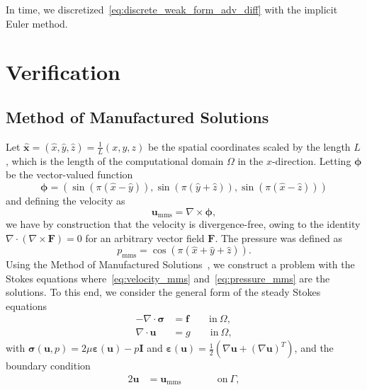 \documentclass[fleqn]{wlscirep}
\newcommand{\ff}{\mathbf{f}}
\newcommand{\uu}{\mathbf{u}}
\newcommand{\xx}{\bm{x}}
\newcommand{\bsig}{\bm{\sigma}}
\newcommand{\beps}{\bm{\varepsilon}}
\begin{document}
In time, we discretized~\eqref{eq:discrete_weak_form_adv_diff} with the implicit Euler method.

\section{Verification}\label{sec:appB_verification}
\subsection{Method of Manufactured Solutions}\label{subsec:mms}
Let $\hat{\xx} = (\hat{x}, \hat{y}, \hat{z}) = \frac{1}{L}(x, y, z)$
be the spatial coordinates scaled by the length $L$, which is the length of
the computational domain $\Omega$ in the $x$-direction. Letting $\bm{\phi}$ be the vector-valued function
\begin{equation*}
    \bm{\phi} = \left(\sin{(\pi(\hat{x} - \hat{y}))}, \sin{(\pi(\hat{y} + \hat{z}))}, \sin{(\pi(\hat{x} - \hat{z}))}\right)
\end{equation*}
and defining the velocity as 
\begin{equation}
    \uu_{\mathrm{mms}} = \nabla\times\bm{\phi},
    \label{eq:velocity_mms}
\end{equation}
we have by construction that the velocity is divergence-free,
owing to the identity $\nabla\cdot(\nabla\times\mathbf{F}) = 0$ for
an arbitrary vector field $\mathbf{F}$. The pressure was defined as
\begin{equation}
    p_{\mathrm{mms}} = \cos{(\pi(\hat{x} + \hat{y} + \hat{z}))}.
    \label{eq:pressure_mms}
\end{equation}
Using the Method of Manufactured Solutions~\cite{Roache2001CodeSolutions},
we construct a problem with the Stokes equations where~\eqref{eq:velocity_mms}
and~\eqref{eq:pressure_mms} are the solutions.
To this end, we consider the general form of the steady Stokes equations
\begin{subequations}
    \begin{align}
        -\nabla\cdot\bsig &= \ff \qquad\mathrm{in \ }\Omega,\\
        \nabla\cdot\uu &= g \qquad\mathrm{in \ }\Omega,
    \end{align}
    \label{eq:stokes_mms}%
\end{subequations}%
with $\bsig(\uu, p) = 2\mu\beps(\uu) - p\mathbf{I}$ and
$\beps(\uu) = \frac{1}{2}\left(\nabla\uu + (\nabla\uu)^T\right)$, and the boundary condition
\begin{alignat}{2}
    \uu &= \uu_{\mathrm{mms}} \qquad&&\mathrm{on \ }\Gamma,
\end{alignat}
\end{document}

